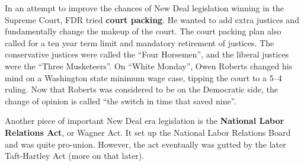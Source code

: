 In an attempt to improve the chances of New Deal legislation winning in the Supreme Court,
FDR tried \textbf{court packing}.
He wanted to add extra justices and fundamentally change the makeup of the court.
The court packing plan also called for a ten year term limit and mandatory retirement of justices.
The conservative justices were called the ``Four Horsemen'',
and the liberal justices were the ``Three Musketeers''.
On ``White Monday'', Owen Roberts changed his mind on a Washington state minimum wage case,
tipping the court to a 5--4 ruling.
Now that Roberts was considered to be on the Democratic side,
the change of opinion is called ``the switch in time that saved nine''.

Another piece of important New Deal era legislation is the \textbf{National Labor Relations Act}, or Wagner Act.
It set up the National Labor Relations Board and was quite pro-union.
However, the act eventually was gutted by the later Taft-Hartley Act (more on that later).

